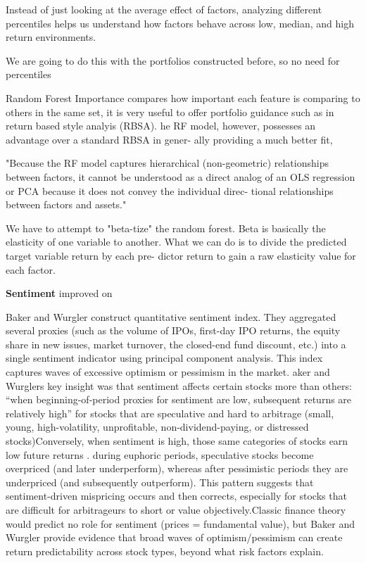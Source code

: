Instead of just looking at the average effect of factors, analyzing different percentiles helps us understand how factors behave across low, median, and high return environments.

We are going to do this with the portfolios constructed before, so no need for percentiles


Random Forest Importance compares how important each feature is comparing to others in the same set, it is very useful to offer portfolio guidance such as in  return based style analyis (RBSA). he RF model, however,
possesses an advantage over a standard RBSA in gener-
ally providing a much better fit,

"Because the RF model captures hierarchical
(non-geometric) relationships between factors, it cannot
be understood as a direct analog of an OLS regression
or PCA because it does not convey the individual direc-
tional relationships between factors and assets."

We have to attempt to "beta-tize" the random forest. Beta is basically the elasticity of one variable to another. What we can do is to divide the predicted target variable return by each pre-
dictor return to gain a raw elasticity value for each factor.

\textbf{Sentiment}
\cite{antoniou_2016} improved on \cite{wurgler_2007}

Baker and Wurgler construct quantitative sentiment index. They aggregated several proxies (such as the volume of IPOs, first-day IPO returns, the equity share in new issues, market turnover, the closed-end fund discount, etc.) into a single sentiment indicator using principal component analysis. This index captures waves of excessive optimism or pessimism in the market. aker and Wurglers key insight was that sentiment affects certain stocks more than others: “when beginning-of-period proxies for sentiment are low, subsequent returns are relatively high” for stocks that are speculative and hard to arbitrage (small, young, high-volatility, unprofitable, non-dividend-paying, or distressed stocks)Conversely, when sentiment is high, those same categories of stocks earn low future returns . during euphoric periods, speculative stocks become overpriced (and later underperform), whereas after pessimistic periods they are underpriced (and subsequently outperform). This pattern suggests that sentiment-driven mispricing occurs and then corrects, especially for stocks that are difficult for arbitrageurs to short or value objectively.Classic finance theory would predict no role for sentiment (prices = fundamental value), but Baker and Wurgler provide evidence that broad waves of optimism/pessimism can create return predictability across stock types, beyond what risk factors explain.



